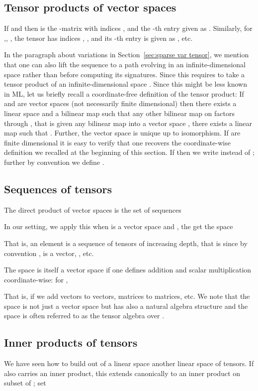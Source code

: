 \documentclass{article}
\begin{document}
\subsection{Tensor products of vector spaces}
  If  and  then  is the -matrix with indices ,  and the -th entry given as .
  Similarly, for ,, , the tensor  has indices , ,  and its -th entry is given as , etc. 

  In the paragraph about variations in Section~\ref{sec:sparse var tensor}, we mention that one can also lift the sequence to a path evolving in an infinite-dimensional space  rather than  before computing its signatures.
  Since  this requires to take a tensor product of an infinite-dimensional space .
  Since this might be less known in ML, let us briefly recall a coordinate-free definition of the tensor product:
  If  and  are vector spaces (not necessarily finite dimensional) then there exists a linear space  and a bilinear map  such that any other bilinear map on  factors through , that is given any bilinear map  into a vector space , there exists a linear map  such that .
  Further, the vector space  is unique up to isomorphism.
  If  are finite dimensional it is easy to verify that one recovers the coordinate-wise definition we recalled at the beginning of this section.
  If  then we write  instead of ; further by convention we define .
  

\subsection{Sequences of tensors }
The direct product  of vector spaces  is the set of sequences 

In our setting, we apply this when  is a vector space and , the get the space 

That is, an element  is a sequence of tensors of increasing depth, that is  since by convention ,  is a vector, , etc.

The space  is itself a vector space if one defines addition and scalar multiplication coordinate-wise: for ,

That is, if  we add vectors to vectors, matrices to matrices, etc.
We note that the space  is not just a vector space but has also a natural algebra structure and the space  is often referred to as the tensor algebra over .
\subsection{Inner products of tensors}
We have seen how to build out of a linear space  another linear space  of tensors.
If  also carries an inner product,  this extends canonically to an inner product on subset of ; set
\end{document}
